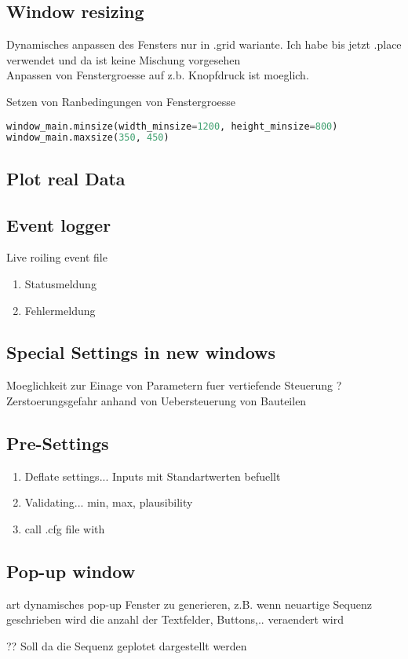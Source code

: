 \subsection{Window resizing}

Dynamisches anpassen des Fensters nur in .grid wariante.
Ich habe bis jetzt .place verwendet und da ist keine Mischung vorgesehen\\

Anpassen von Fenstergroesse auf z.b. Knopfdruck ist moeglich.

Setzen von Ranbedingungen von Fenstergroesse 

\begin{lstlisting}[language=Python]
window_main.minsize(width_minsize=1200, height_minsize=800) 
window_main.maxsize(350, 450)

\end{lstlisting}



\subsection{Plot real Data}


\subsection{Event logger}
Live roiling event file\\
 \begin{enumerate}
     \item Statusmeldung
     \item Fehlermeldung
 \end{enumerate}



\subsection{Special Settings in new windows}
Moeglichkeit zur Einage von Parametern fuer vertiefende Steuerung
? Zerstoerungsgefahr anhand von Uebersteuerung von Bauteilen

\subsection{ Pre-Settings}
\begin{enumerate}
    \item Deflate settings... Inputs mit Standartwerten befuellt
    \item  Validating... min, max, plausibility
    \item call .cfg file with 
\end{enumerate}

\subsection{Pop-up window}
art dynamisches pop-up Fenster zu generieren, z.B. wenn neuartige Sequenz geschrieben wird die anzahl der Textfelder, Buttons,.. veraendert wird

?? 
Soll da die Sequenz geplotet dargestellt werden

